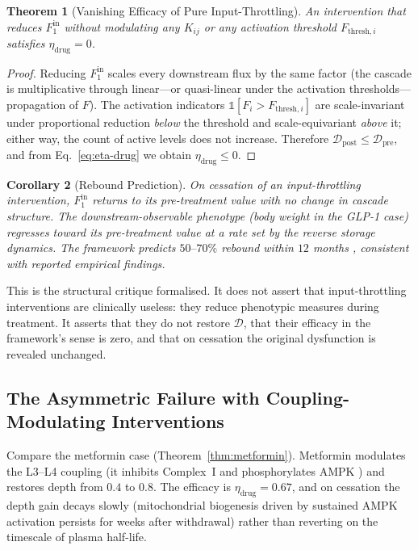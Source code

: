 \documentclass[11pt,twocolumn,a4paper]{article}
\newtheorem{theorem}{Theorem}[section]
\newtheorem{corollary}[theorem]{Corollary}
\theoremstyle{definition}
\theoremstyle{remark}
\newcommand{\Dhier}{\mathcal{D}}
\newcommand{\Fin}{F^{\mathrm{in}}}
\newcommand{\etadrug}{\eta_{\mathrm{drug}}}
\newcommand{\Korder}{K}
\begin{document}
\begin{theorem}[Vanishing Efficacy of Pure Input-Throttling]
\label{thm:input-throttle}
An intervention that reduces $\Fin_1$ without modulating any
$\Korder_{ij}$ or any activation threshold $F_{\mathrm{thresh},i}$
satisfies $\etadrug = 0$.
\end{theorem}

\begin{proof}
Reducing $\Fin_1$ scales every downstream flux by the same factor
(the cascade is multiplicative through linear---or quasi-linear under
the activation thresholds---propagation of $F$). The activation
indicators $\mathbb{1}[F_i > F_{\mathrm{thresh},i}]$ are scale-invariant
under proportional reduction \emph{below} the threshold and
scale-equivariant \emph{above} it; either way, the count of active
levels does not increase. Therefore $\Dhier_{\mathrm{post}} \leq
\Dhier_{\mathrm{pre}}$, and from
Eq.~\eqref{eq:eta-drug} we obtain $\etadrug \leq 0$.
\end{proof}

\begin{corollary}[Rebound Prediction]
\label{cor:rebound}
On cessation of an input-throttling intervention, $\Fin_1$ returns
to its pre-treatment value with no change in cascade structure.
The downstream-observable phenotype (body weight in the GLP-1
case) regresses toward its pre-treatment value at a rate set by the
reverse storage dynamics. The framework predicts $50\text{--}70\%$
rebound within $12$ months \citep{wilding2022, davies2024,
rubino2022}, consistent with reported empirical findings.
\end{corollary}

This is the structural critique formalised. It does not assert that
input-throttling interventions are clinically useless: they reduce
phenotypic measures during treatment. It asserts that they do not
restore $\Dhier$, that their efficacy in the framework's sense is
zero, and that on cessation the original dysfunction is revealed
unchanged.

\subsection{The Asymmetric Failure with Coupling-Modulating
Interventions}

Compare the metformin case (Theorem~\ref{thm:metformin}). Metformin
modulates the L3--L4 coupling (it inhibits Complex~I and
phosphorylates AMPK \citep{foretz2014, owen2000, hardie2012}) and
restores depth from $0.4$ to $0.8$. The efficacy is $\etadrug =
0.67$, and on cessation the depth gain decays slowly (mitochondrial
biogenesis driven by sustained AMPK activation persists for weeks
after withdrawal) rather than reverting on the timescale of plasma
half-life.
\end{document}
